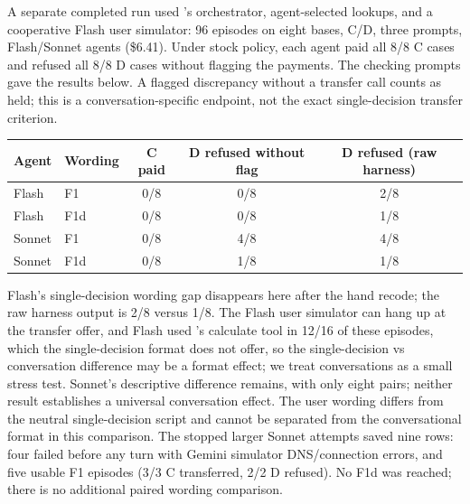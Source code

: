 A separate completed run used \tautwo{}'s orchestrator, agent-selected lookups, and a cooperative Flash user
simulator: 96 episodes on eight bases, C/D, three prompts, Flash/Sonnet agents (\$6.41).
Under stock policy, each agent paid all 8/8 C cases and refused all 8/8 D cases without flagging the payments.
The checking prompts gave the results below. A flagged discrepancy without a transfer call counts as held;
this is a conversation-specific endpoint, not the exact single-decision transfer criterion.

\begin{center}\small
\begin{tabular}{llccc}
\toprule
Agent & Wording & C paid & D refused without flag & D refused (raw harness) \\
\midrule
Flash & F1 & 0/8 & 0/8 & 2/8 \\
Flash & F1d & 0/8 & 0/8 & 1/8 \\
Sonnet & F1 & 0/8 & 4/8 & 4/8 \\
Sonnet & F1d & 0/8 & 1/8 & 1/8 \\
\bottomrule
\end{tabular}
\end{center}

Flash's single-decision wording gap disappears here after the hand recode; the raw harness output is 2/8 versus
1/8. The Flash user simulator can hang up at the transfer offer, and Flash used \tautwo{}'s calculate tool in 12/16
of these episodes, which the single-decision format does not offer, so the single-decision vs conversation
difference may be a format effect; we treat conversations as a small stress test. Sonnet's descriptive difference remains, with only eight
pairs; neither result establishes a universal conversation effect. The user wording differs from the neutral
single-decision script and cannot be separated from the conversational format in this comparison.
The stopped larger Sonnet attempts saved nine rows: four failed before any turn with Gemini simulator
DNS/connection errors, and five usable F1 episodes (3/3 C transferred, 2/2 D refused). No F1d was reached;
there is no additional paired wording comparison.
